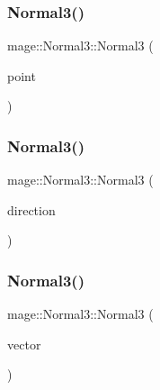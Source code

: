 \hypertarget{structmage_1_1_normal3_a1a58b2fcb3920ff68007257ae6434273}{}\label{structmage_1_1_normal3_a1a58b2fcb3920ff68007257ae6434273} 
\subsubsection{\texorpdfstring{Normal3()}{Normal3()}\hspace{0.1cm}{\footnotesize\ttfamily [4/6]}}
{\footnotesize\ttfamily mage\+::\+Normal3\+::\+Normal3 (\begin{DoxyParamCaption}\item[{const \hyperlink{structmage_1_1_point3}{Point3} \&}]{point }\end{DoxyParamCaption})\hspace{0.3cm}{\ttfamily [explicit]}}

\hypertarget{structmage_1_1_normal3_a0942e7aace8354f0a414f77ccf90b69c}{}\label{structmage_1_1_normal3_a0942e7aace8354f0a414f77ccf90b69c} 
\subsubsection{\texorpdfstring{Normal3()}{Normal3()}\hspace{0.1cm}{\footnotesize\ttfamily [5/6]}}
{\footnotesize\ttfamily mage\+::\+Normal3\+::\+Normal3 (\begin{DoxyParamCaption}\item[{const \hyperlink{structmage_1_1_direction3}{Direction3} \&}]{direction }\end{DoxyParamCaption})\hspace{0.3cm}{\ttfamily [explicit]}}

\hypertarget{structmage_1_1_normal3_a61565f1183535666a2fb5183b83bebd2}{}\label{structmage_1_1_normal3_a61565f1183535666a2fb5183b83bebd2} 
\subsubsection{\texorpdfstring{Normal3()}{Normal3()}\hspace{0.1cm}{\footnotesize\ttfamily [6/6]}}
{\footnotesize\ttfamily mage\+::\+Normal3\+::\+Normal3 (\begin{DoxyParamCaption}\item[{const X\+M\+F\+L\+O\+A\+T3 \&}]{vector }\end{DoxyParamCaption})\hspace{0.3cm}{\ttfamily [explicit]}}

